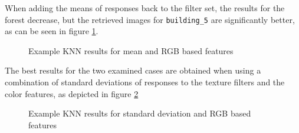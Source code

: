 When adding the means of responses back to the filter set, the results for the forest decrease, but the retrieved images for \texttt{building\_5} are significantly better, as can be seen in figure \ref{fig:100001}.

\begin{figure}[!hbt]
\centering
{}
\caption{Example KNN results for mean and RGB based features}
\label{fig:100001}
\end{figure}

The best results for the two examined cases are obtained when using a combination of standard deviations of responses to the texture filters and the color features, as depicted in figure \ref{fig:010001}

\begin{figure}[!hbt]
\centering
{}
\caption{Example KNN results for standard deviation and RGB based features}
\label{fig:010001}
\end{figure}

